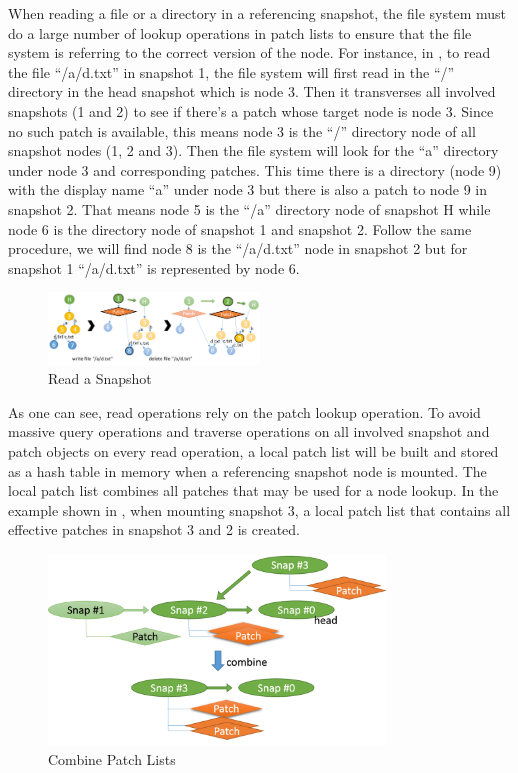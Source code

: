     When reading a file or a directory in a referencing snapshot, the file system must do a large number of lookup operations in patch lists to ensure that the file system is referring to the correct version of the node. For instance, in , to read the file ``/a/d.txt'' in snapshot 1, the file system will first read in the ``/'' directory in the head snapshot which is node 3. Then it transverses all involved snapshots (1 and 2) to see if there's a patch whose target node is node 3. Since no such patch is available, this means node 3 is the ``/'' directory node of all snapshot nodes (1, 2 and 3). Then the file system will look for the ``a'' directory under node 3 and corresponding patches. This time there is a directory (node 9) with the display name ``a'' under node 3 but there is also a patch to node 9 in snapshot 2. That means node 5 is the ``/a'' directory node of snapshot H while node 6 is the directory node of snapshot 1 and snapshot 2. Follow the same procedure, we will find node 8 is the ``/a/d.txt'' node in snapshot 2 but for snapshot 1 ``/a/d.txt'' is represented by node 6.

\begin{figure}[t]
\centering
\includegraphics[width=0.5\textwidth]{Chapter-4/figs/fig18.png}
\caption{Read a Snapshot}
\label{fig:read_patches}
\end{figure}

    As one can see, read operations rely on the patch lookup operation. To avoid massive query operations and traverse operations on all involved snapshot and patch objects on every read operation, a local patch list will be built and stored as a hash table in memory when a referencing snapshot node is mounted. The local patch list combines all patches that may be used for a node lookup. In the example shown in , when mounting snapshot 3, a local patch list that contains all effective patches in snapshot 3 and 2 is created.

\begin{figure}[t]
\centering
\includegraphics[width=0.8\textwidth]{Chapter-4/figs/fig15.png}
\caption{Combine Patch Lists}
\label{fig:combine_patch_list}
\end{figure}

